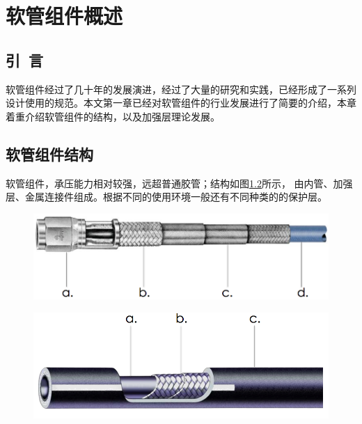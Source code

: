 
\chapter{软管组件概述}
\section{引~言}
软管组件经过了几十年的发展演进，经过了大量的研究和实践，已经形成了一系列设计使用的规范。本文第一章已经对软管组件的行业发展进行了简要的介绍，本章着重介绍软管组件的结构，以及加强层理论发展。

\section{软管组件结构}
软管组件，承压能力相对较强，远超普通胶管；结构如图\ref{fig:hose structure}所示，
由内管、加强层、金属连接件组成。根据不同的使用环境一般还有不同种类的的保护层。




\begin{figure}[!htbp]
	\centering
	\includegraphics[width=0.6\linewidth]{figure/chap1/Hose-Structure}
	\label{fig:hose structure}
\end{figure}

\begin{figure}[!htbp]
	\centering
	\includegraphics[width=0.6\linewidth]{figure/chap1/Parker-hose}
	\label{fig:hose structure}
\end{figure}

